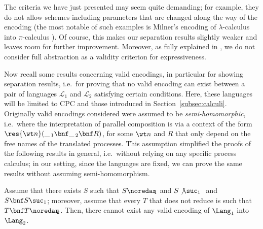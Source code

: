 \documentclass{LMCS}
\begin{document}
The criteria we have just presented may seem quite demanding; for example,
they do not allow schemes including parameters that are changed along the 
way of the encoding (the most notable of such examples is Milner's encoding
of $\lambda$-calculus into $\pi$-calculus \cite{Milner92}). Of course, this
makes our separation results slightly weaker and leaves room for further
improvement. Moreover, as fully explained in \cite{GN:MSCS14}, we do not 
consider full abstraction as a validity criterion for expressiveness.

Now recall some results concerning valid encodings, in particular for showing
separation results, i.e.\ for proving that no valid encoding can exist between
a pair of languages ${\mathcal L}_1$ and ${\mathcal L}_2$ satisfying certain
conditions.
Here, these languages will be limited to CPC and those introduced in Section~\ref{subsec:calculi}.
Originally valid encodings considered were assumed to be {\em semi-homomorphic}, 
i.e.\ where the interpretation of parallel
  composition is via a context of the form $\res {\wt n}(\_\,_1\bnf
  \_\,_2\bnf R)$, for some $\wt n$ and $R$ that only depend on the
  free names of the translated processes.
This assumption simplified the proofs of the following results in general, i.e.\ without
relying on any specific process calculus; in our setting, since the languages are fixed,
we can prove the same results without assuming semi-homomorphism.




\begin{thm}
\label{autoriduz}
Assume that there exists $S$ such that $S \noredar\!\!_1$ and
$S \not\suc_1\ $ and $S\bnf S \suc_1$; 
moreover, assume that every $T$
that does not reduce is such that $T\bnf T \noredar\!\!_2$. Then, 
there cannot exist any 
valid encoding of $\Lang_1$ into $\Lang_2$.
\end{thm}
\end{document}
